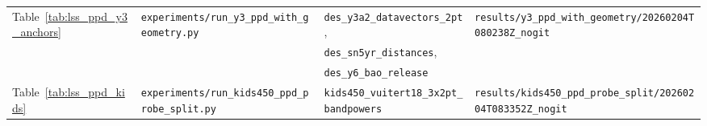\documentclass[11pt]{article}
\theoremstyle{definition}
\theoremstyle{plain}
\theoremstyle{remark}
\begin{document}
\begin{landscape}
\begin{table}[p]
\begin{tabular}{@{}llll@{}}
Table~\ref{tab:lss_ppd_y3_anchors} &
\texttt{experiments/run\_y3\_ppd\_with\_geometry.py} &
\texttt{des\_y3a2\_datavectors\_2pt}, &
\texttt{results/y3\_ppd\_with\_geometry/20260204T080238Z\_nogit} \\
& &
\texttt{des\_sn5yr\_distances}, & \\
& &
\texttt{des\_y6\_bao\_release} & \\[2pt]
Table~\ref{tab:lss_ppd_kids} &
\texttt{experiments/run\_kids450\_ppd\_probe\_split.py} &
\texttt{kids450\_vuitert18\_3x2pt\_bandpowers} &
\texttt{results/kids450\_ppd\_probe\_split/20260204T083352Z\_nogit} \\
\bottomrule
\end{tabular}
\end{table}
\end{landscape}
 


\end{document}
